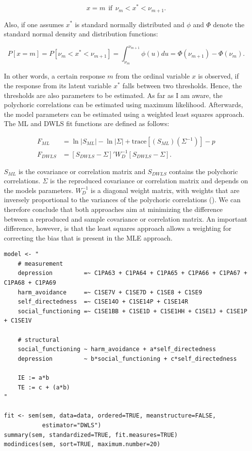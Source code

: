\documentclass[11pt]{article}
\begin{document}
\begin{equation}
  x = m \:\: \text{if} \:\: \nu_m < x^* < \nu_{m+1} .
\end{equation}

Also, if one assumes $x^*$ is standard normally distributed and $\phi$ and
$\Phi$ denote the standard normal density and distribution functions:

\begin{equation}
  P[x=m] = P[\nu_m < x^* < \nu_{m+1}] = \int^{\nu_{m+1}}_{\nu_m} \phi(u)du = \Phi(\nu_{m+1}) - \Phi(\nu_m) .
\end{equation}

In other words, a certain response $m$ from the ordinal variable $x$ is
observed, if the response from its latent variable $x^*$ falls between two
thresholds. Hence, the thresholds are also parameters to be estimated. As far as
I am aware, the polychoric correlations can be estimated using maximum
likelihood. Afterwards, the model parameters can be estimated using a weighted
least squares approach. The ML and DWLS fit functions are defined as follows:

\begin{align}
  F_{ML} &= \ln |S_{ML}| - \ln |\Sigma| + \text{trace}[(S_{ML})(\Sigma^{-1})] - p \tag{ML fit function} \\
  F_{DWLS} &= [S_{DWLS}-\Sigma]' W^{-1}_D [S_{DWLS}-\Sigma].                      \tag{DWLS fit function}
\end{align}

$S_{ML}$ is the covariance or correlation matrix and $S_{DWLS}$ contains the
polychoric correlations. $\Sigma$ is the reproduced covariance or correlation
matrix and depends on the models parameters. $W_D^{-1}$ is a diagonal weight
matrix, with weights that are inversely proportional to the variances of the
polychoric correlations (\cite{yangwallentin2010}). We can therefore conclude
that both approaches aim at minimizing the difference between a reproduced and
sample covariance or correlation matrix. An important difference, however, is
that the least squares approach allows a weighting for correcting the bias that
is present in the MLE approach.

\begin{minipage}{\linewidth}
\begin{lstlisting}
model <- "
    # measurement
    depression         =~ C1PA63 + C1PA64 + C1PA65 + C1PA66 + C1PA67 + C1PA68 + C1PA69
    harm_avoidance     =~ C1SE7V + C1SE7D + C1SE8 + C1SE9
    self_directedness  =~ C1SE14O + C1SE14P + C1SE14R
    social_functioning =~ C1SE1BB + C1SE1D + C1SE1HH + C1SE1J + C1SE1P + C1SE1V

    # structural
    social_functioning ~ harm_avoidance + a*self_directedness
    depression         ~ b*social_functioning + c*self_directedness
    
    IE := a*b
    TE := c + (a*b) 
"

fit <- sem(sem, data=data, ordered=TRUE, meanstructure=FALSE,
           estimator="DWLS")
summary(sem, standardized=TRUE, fit.measures=TRUE)
modindices(sem, sort=TRUE, maximum.number=20)
\end{lstlisting}
\end{minipage}
\end{document}
